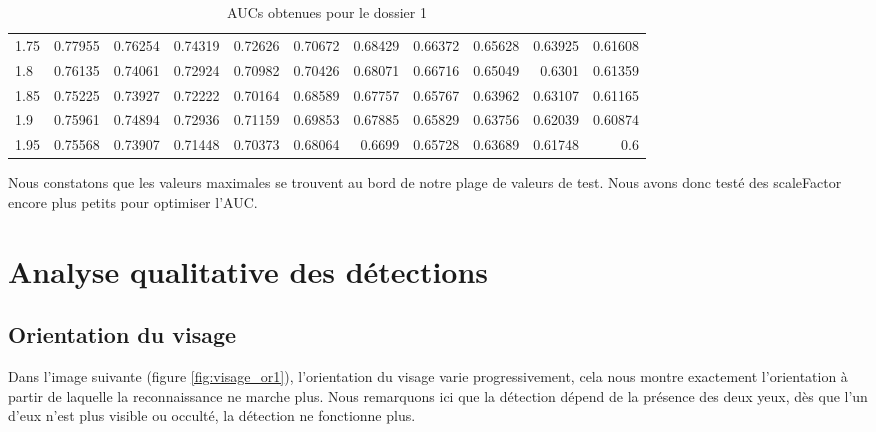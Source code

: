 \documentclass[a4paper,11pt]{article}
\begin{document}
\begin{table}
{\begin{tabular}{|l|*{10}r|}
                1.75 &  0.77955 & 0.76254  & 0.74319 & 0.72626  & 0.70672  & 0.68429  & 0.66372 & 0.65628  & 0.63925 & 0.61608 \\
                1.8  &  0.76135 & 0.74061  & 0.72924 & 0.70982  & 0.70426  & 0.68071  & 0.66716 & 0.65049  & 0.6301  & 0.61359 \\
                1.85 &  0.75225 & 0.73927  & 0.72222 & 0.70164  & 0.68589  & 0.67757  & 0.65767 & 0.63962  & 0.63107 & 0.61165 \\
                1.9  &  0.75961 & 0.74894  & 0.72936 & 0.71159  & 0.69853  & 0.67885  & 0.65829 & 0.63756  & 0.62039 & 0.60874 \\
                1.95 &  0.75568 & 0.73907  & 0.71448 & 0.70373  & 0.68064  & 0.6699   & 0.65728 & 0.63689  & 0.61748 & 0.6 \\
                \hline
            \end{tabular}}
            \caption{AUCs obtenues pour le dossier 1}
            \label{tab:parmeters}
        \end{table}

        Nous constatons que les valeurs maximales se trouvent au bord de notre plage de valeurs de test. 
        Nous avons donc testé des scaleFactor encore plus petits pour optimiser l'AUC.
        


\section{Analyse qualitative des détections}
    
    \subsection{Orientation du visage}
	
	Dans l'image suivante (figure \ref{fig:visage_or1}), l'orientation du visage varie
	progressivement, cela nous montre exactement l'orientation à partir de laquelle la
	reconnaissance ne marche plus. Nous remarquons ici que la détection dépend de la présence
	des deux yeux, dès que l'un d'eux n'est plus visible ou occulté, la détection ne fonctionne
	plus.
\end{document}
